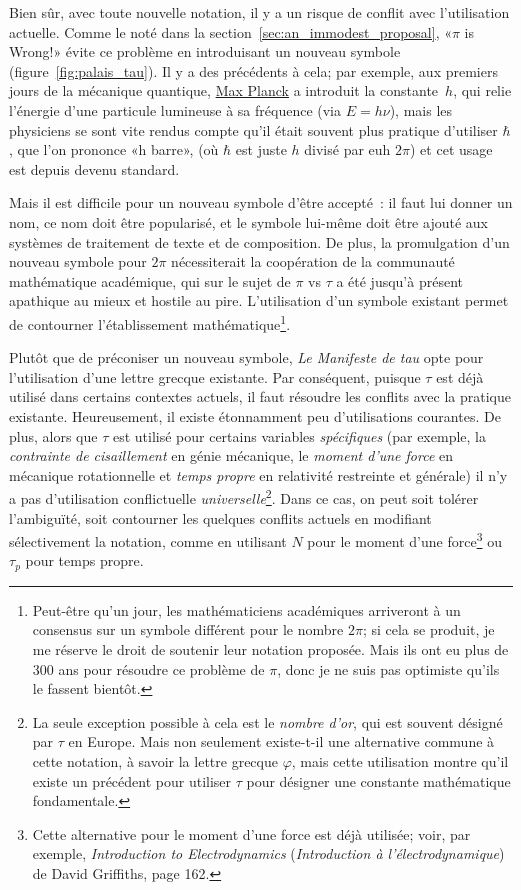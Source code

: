 Bien sûr, avec toute nouvelle notation, il y a un risque de conflit avec
l'utilisation actuelle. Comme le noté dans la
section~\ref{sec:an_immodest_proposal}, «\ns $\pi$ is Wrong!\ns » évite ce problème
en introduisant un nouveau symbole (figure~\ref{fig:palais_tau}). Il y a des
précédents à cela\ns; par exemple, aux premiers jours de la mécanique quantique,
\href{https://fr.wikipedia.org/wiki/Max_Planck}{Max Planck} a introduit la
constante~$h$, qui relie l'énergie d'une particule lumineuse à sa fréquence (via
$E = h\nu$), mais les physiciens se sont vite rendus compte qu'il était souvent
plus pratique d'utiliser $\hbar$, que l'on prononce «\ns h barre\ns », (où $\hbar$
est juste $h$ divisé par\textellipsis{} euh\textellipsis{} $2\pi$) et cet usage
est depuis devenu standard.

Mais il est difficile pour un nouveau symbole d'être accepté~: il faut lui
donner un nom, ce nom doit être popularisé, et le symbole lui-même doit être
ajouté aux systèmes de traitement de texte et de composition. De plus, la
promulgation d'un nouveau symbole pour $2\pi$ nécessiterait la coopération de la
communauté mathématique académique, qui sur le sujet de $\pi$ vs $\tau$ a été
jusqu'à présent apathique au mieux et hostile au pire. L'utilisation d'un
symbole existant permet de contourner l'établissement
mathématique\ns\footnote{Peut-être qu'un jour, les mathématiciens académiques
arriveront à un consensus sur un symbole différent pour le nombre $2\pi$\ns; si
cela se produit, je me réserve le droit de soutenir leur notation proposée. Mais
ils ont eu plus de 300 ans pour résoudre ce problème de $\pi$, donc je ne suis
pas optimiste qu'ils le fassent bientôt.}.

Plutôt que de préconiser un nouveau symbole, \emph{Le Manifeste de tau} opte
pour l'utilisation d'une lettre grecque existante. Par conséquent, puisque
$\tau$ est déjà utilisé dans certains contextes actuels, il faut résoudre les
conflits avec la pratique existante. Heureusement, il existe étonnamment peu
d'utilisations courantes. De plus, alors que $\tau$ est utilisé pour certains
variables \emph{spécifiques} (par exemple, la \emph{contrainte de cisaillement}
en génie mécanique, le \emph{moment d'une force} en mécanique rotationnelle et
\emph{temps propre} en relativité restreinte et générale) il n'y a pas
d'utilisation conflictuelle \emph{universelle}\ns\footnote{La seule exception
possible à cela est le \emph{nombre d'or}, qui est souvent désigné par $\tau$ en
Europe. Mais non seulement existe-t-il une alternative commune à cette notation,
à savoir la lettre grecque $\varphi$, mais cette utilisation montre qu'il existe
un précédent pour utiliser $\tau$ pour désigner une constante mathématique
fondamentale.}. Dans ce cas, on peut soit tolérer l'ambiguïté, soit contourner
les quelques conflits actuels en modifiant sélectivement la notation, comme en
utilisant $N$ pour le moment d'une force\ns\footnote{Cette alternative pour le
moment d'une force est déjà utilisée\ns; voir, par exemple, \emph{Introduction to
Electrodynamics} (\emph{Introduction à l'électrodynamique}) de David Griffiths,
page 162.} ou $\tau_p$ pour temps propre.

